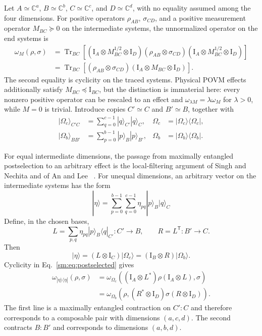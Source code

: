 \documentclass[aps,prl,reprint,superscriptaddress,nofootinbib]{revtex4-2}
\newcommand{\I}{\mathrm{I}}
\newcommand{\C}{\mathbb C}
\newcommand{\Tr}{\operatorname{Tr}}
\begin{document}
Let \(A\simeq\C^a\), \(B\simeq\C^b\), \(C\simeq\C^c\), and
\(D\simeq\C^d\), with no equality assumed among the four dimensions.
For positive operators
\(\rho_{AB}\), \(\sigma_{CD}\), and a positive measurement operator
\(M_{BC}\succeq0\) on the intermediate systems, the unnormalized operator
on the end systems is
\begin{align}
 \omega_M(\rho,\sigma)
 &=\Tr_{BC}\!\left[(\I_A\otimes M_{BC}^{1/2}\otimes\I_D)
 (\rho_{AB}\otimes\sigma_{CD})
 (\I_A\otimes M_{BC}^{1/2}\otimes\I_D)\right]
\nonumber\\
 &=\Tr_{BC}\!\left[(\rho_{AB}\otimes\sigma_{CD})
 (\I_A\otimes M_{BC}\otimes\I_D)\right].
\label{sm:eq:postselected}
\end{align}
The second equality is cyclicity on the traced systems.  Physical POVM
effects additionally satisfy \(M_{BC}\preceq\I_{BC}\), but the distinction
is immaterial here: every nonzero positive operator can be rescaled to an
effect and \(\omega_{\lambda M}=\lambda\omega_M\) for \(\lambda>0\), while
\(M=0\) is trivial.  Introduce copies
\(C'\simeq C\) and \(B'\simeq B\), together with
\begin{align}
 |\Omega_c\rangle_{C'C}&=\sum_{q=0}^{c-1}|q\rangle_{C'}|q\rangle_C,
 &\Omega_c&=|\Omega_c\rangle\langle\Omega_c|,
\nonumber\\
 |\Omega_b\rangle_{BB'}&=\sum_{p=0}^{b-1}|p\rangle_B|p\rangle_{B'},
 &\Omega_b&=|\Omega_b\rangle\langle\Omega_b|.
\label{sm:eq:omegas}
\end{align}

For equal intermediate dimensions, the passage from maximally entangled
postselection to an arbitrary effect is the local-filtering argument of Singh
and Nechita and of An and Lee~\cite[Proposition~2.1]{Singh2022}
\cite[Theorem~9 and Appendix~E]{An2026}.  For unequal dimensions, an
arbitrary vector on the intermediate systems has the form
\begin{equation}
 |\eta\rangle=\sum_{p=0}^{b-1}\sum_{q=0}^{c-1}
 \eta_{pq}|p\rangle_B|q\rangle_C
\label{sm:eq:etacoefficients}
\end{equation}
Define, in the chosen bases,
\begin{equation}
 L=\sum_{p,q}\eta_{pq}|p\rangle_B\langle q|_{C'}:C'\to B,
 \qquad R=L^{\mathsf T}:B'\to C.
\label{sm:eq:rectfilters}
\end{equation}
Then
\begin{equation}
 |\eta\rangle=(L\otimes\I_C)|\Omega_c\rangle
 =(\I_B\otimes R)|\Omega_b\rangle.
\label{sm:eq:tworepresentations}
\end{equation}
Cyclicity in Eq.~\eqref{sm:eq:postselected} gives
\begin{align}
 \omega_{|\eta\rangle\langle\eta|}(\rho,\sigma)
 &=\omega_{\Omega_c}\!\left(
 (\I_A\otimes L^*)\rho(\I_A\otimes L),\sigma\right)
\nonumber\\
 &=\omega_{\Omega_b}\!\left(
 \rho,(R^*\otimes\I_D)\sigma(R\otimes\I_D)\right).
\label{sm:eq:filteridentities}
\end{align}
The first line is a maximally entangled contraction on \(C'{:}C\) and
therefore corresponds to a composable pair with dimensions \((a,c,d)\).
The second contracts \(B{:}B'\) and corresponds to dimensions \((a,b,d)\).
\end{document}
